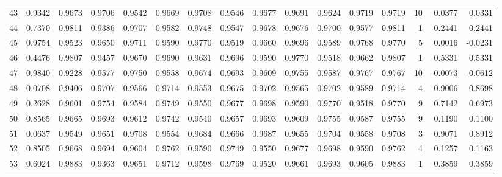 \begin{tabular}{lrrrrrrrrrrrrrrr}
43  &      0.9342 &  0.9673 &  0.9706 &  0.9542 &  0.9669 &  0.9708 &  0.9546 &  0.9677 &  0.9691 &  0.9624 &   0.9719 &     0.9719 &     10 &                    0.0377 &                     0.0331 \\
44  &      0.7370 &  0.9811 &  0.9386 &  0.9707 &  0.9582 &  0.9748 &  0.9547 &  0.9678 &  0.9676 &  0.9700 &   0.9577 &     0.9811 &      1 &                    0.2441 &                     0.2441 \\
45  &      0.9754 &  0.9523 &  0.9650 &  0.9711 &  0.9590 &  0.9770 &  0.9519 &  0.9660 &  0.9696 &  0.9589 &   0.9768 &     0.9770 &      5 &                    0.0016 &                    -0.0231 \\
46  &      0.4476 &  0.9807 &  0.9457 &  0.9670 &  0.9690 &  0.9631 &  0.9696 &  0.9590 &  0.9770 &  0.9518 &   0.9662 &     0.9807 &      1 &                    0.5331 &                     0.5331 \\
47  &      0.9840 &  0.9228 &  0.9577 &  0.9750 &  0.9558 &  0.9674 &  0.9693 &  0.9609 &  0.9755 &  0.9587 &   0.9767 &     0.9767 &     10 &                   -0.0073 &                    -0.0612 \\
48  &      0.0708 &  0.9406 &  0.9707 &  0.9566 &  0.9714 &  0.9553 &  0.9675 &  0.9702 &  0.9565 &  0.9702 &   0.9589 &     0.9714 &      4 &                    0.9006 &                     0.8698 \\
49  &      0.2628 &  0.9601 &  0.9754 &  0.9584 &  0.9749 &  0.9550 &  0.9677 &  0.9698 &  0.9590 &  0.9770 &   0.9518 &     0.9770 &      9 &                    0.7142 &                     0.6973 \\
50  &      0.8565 &  0.9665 &  0.9693 &  0.9612 &  0.9742 &  0.9540 &  0.9657 &  0.9693 &  0.9609 &  0.9755 &   0.9587 &     0.9755 &      9 &                    0.1190 &                     0.1100 \\
51  &      0.0637 &  0.9549 &  0.9651 &  0.9708 &  0.9554 &  0.9684 &  0.9666 &  0.9687 &  0.9655 &  0.9704 &   0.9558 &     0.9708 &      3 &                    0.9071 &                     0.8912 \\
52  &      0.8505 &  0.9668 &  0.9694 &  0.9604 &  0.9762 &  0.9590 &  0.9749 &  0.9550 &  0.9677 &  0.9698 &   0.9590 &     0.9762 &      4 &                    0.1257 &                     0.1163 \\
53  &      0.6024 &  0.9883 &  0.9363 &  0.9651 &  0.9712 &  0.9598 &  0.9769 &  0.9520 &  0.9661 &  0.9693 &   0.9605 &     0.9883 &      1 &                    0.3859 &                     0.3859 \\

\end{tabular}
